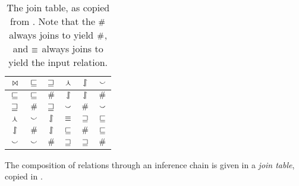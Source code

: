 \begin{table}
	\begin{center}
	\begin{tabular}{|c||c|c|c|c|c|}
    \hline
    $\bowtie$ & $\sqsubseteq$ & $\sqsupseteq$ & $\curlywedge$ & $\downharpoonleft\hspace{-0.30em}\upharpoonright$ & $\smallsmile$ \\
    \hline
    $\sqsubseteq$ & $\sqsubseteq$ & $\#$ & $\downharpoonleft\hspace{-0.30em}\upharpoonright$ & $\downharpoonleft\hspace{-0.30em}\upharpoonright$ & $\#$ \\
    $\sqsupseteq$ & $\#$ & $\sqsupseteq$ & $\smallsmile$ & $\#$ & $\smallsmile$ \\
    $\curlywedge$ & $\smallsmile$ & $\downharpoonleft\hspace{-0.30em}\upharpoonright$ & $\equiv$ & $\sqsupseteq$ & $\sqsubseteq$ \\
    $\downharpoonleft\hspace{-0.30em}\upharpoonright$ & $\#$ & $\downharpoonleft\hspace{-0.30em}\upharpoonright$ & $\sqsubseteq$ & $\#$ & $\sqsubseteq$ \\
    $\smallsmile$ & $\smallsmile$ & $\#$ & $\sqsupseteq$ & $\sqsupseteq$ & $\#$ \\
    \hline
	\end{tabular}
	\caption{
    The join table, as copied from .
    Note that the $\#$ always joins to yield $\#$,
    and $\equiv$ always joins to yield the input relation.
		\label{tab:join}
	}
	\end{center}
\end{table}

The composition of relations through an inference chain is given in
  a \textit{join table}, copied in .

%
%

